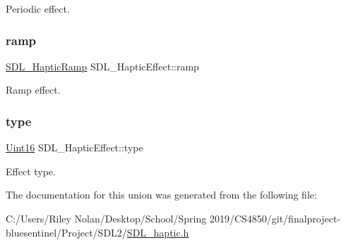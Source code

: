 Periodic effect. \mbox{\label{union_s_d_l___haptic_effect_a1d32ef4c2d1cc89dc938b392f6ad81bd}} 
\subsubsection{\texorpdfstring{ramp}{ramp}}
{\footnotesize\ttfamily \mbox{\hyperlink{struct_s_d_l___haptic_ramp}{S\+D\+L\+\_\+\+Haptic\+Ramp}} S\+D\+L\+\_\+\+Haptic\+Effect\+::ramp}

Ramp effect. \mbox{\label{union_s_d_l___haptic_effect_a5ff6cfd8da91537091e9a6c2108cb179}} 
\subsubsection{\texorpdfstring{type}{type}}
{\footnotesize\ttfamily \mbox{\hyperlink{_s_d_l__stdinc_8h_a31fcc0a076c9068668173ee26d33e42b}{Uint16}} S\+D\+L\+\_\+\+Haptic\+Effect\+::type}

Effect type. 

The documentation for this union was generated from the following file\+:\begin{DoxyCompactItemize}
\item 
C\+:/\+Users/\+Riley Nolan/\+Desktop/\+School/\+Spring 2019/\+C\+S4850/git/finalproject-\/bluesentinel/\+Project/\+S\+D\+L2/\mbox{\hyperlink{_s_d_l__haptic_8h}{S\+D\+L\+\_\+haptic.\+h}}\end{DoxyCompactItemize}
